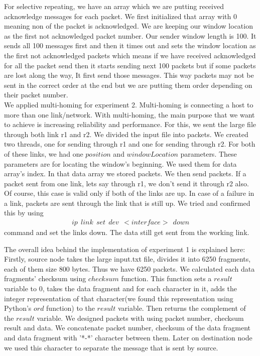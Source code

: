 \documentclass[conference]{IEEEtran}
\begin{document}
For selective repeating, we have an array which we are putting received acknowledge messages for each packet. We first initialized that array with 0 meaning non of the packet is acknowledged. We are keeping our window location as the first not acknowledged packet number. Our sender window length is 100. It sends all 100 messages first and then it times out and sets the window location as the first not acknowledged packets which means if we have received acknowledged for all the packet send then it starts sending next 100 packets but if some packets are lost along the way, It first send those messages. This way packets may not be sent in the correct order at the end but we are putting them order depending on their packet number. \\

We applied multi-homing for experiment 2. Multi-homing is connecting a host to more than one link/network. With multi-homing, the main purpose that we want to achieve is increasing reliability and performance. For this, we sent the large file through both link r1 and r2. We divided the input file into packets. We created two threads, one for sending through r1 and one for sending through r2. For both of these links, we had one $position$ and $windowLocation$ parameters. These parameters are for locating the window's beginning. We used them for data array's index. In that data array we stored packets. We then send packets. If a packet sent from one link, lets say through r1, we don't send it through r2 also. Of course, this case is valid only if both of the links are up. In case of a failure in a link, packets are sent through the link that is still up. We tried and confirmed this by using 
\begin{align*}
    ip \ \ link \ \ set \ \ dev \ \ <interface> \ \ down
\end{align*}
command and set the links down. The data still get sent from the working link.

The overall idea behind the implementation of experiment 1 is explained here: Firstly, source node takes the large input.txt file, divides it into 6250 fragments, each of them size 800 bytes. Thus we have 6250 packets. We calculated each data fragments' checksum using $checksum$ function. This function sets a $result$ variable to 0, takes the data fragment and for each character in it, adds the integer representation of that character(we found this representation using Python's $ord$ function) to the $result$ variable. Then returns the complement of the $result$ variable.  We designed packets with using packet number, checksum result and data. We concatenate packet number, checksum of the data fragment and data fragment with '*-*' character between them. Later on destination node we used this character to separate the message that is sent by source. 
\end{document}
